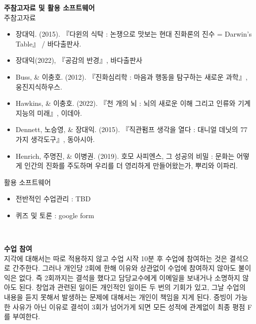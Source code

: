 \documentclass[11pt,letterpaper]{article}
\newcommand{\lefthead}[2]{\noindent\textbf{#1}\hfill\\[#2]}
\begin{document}
\lefthead{주참고자료 및 활용 소프트웨어}{0.3cm}
\noindent 주참고자료 
	\begin{itemize}
	\item  장대익. (2015). 『다윈의 식탁 : 논쟁으로 맛보는 현대 진화론의 진수 = Darwin's Table』 / 바다출판사.
	\item 장대익(2022), 『공감의 반경』, 바다출판사
	\item Buss, \& 이충호. (2012). 『진화심리학 : 마음과 행동을 탐구하는 새로운 과학』, 웅진지식하우스.
	\item Hawkins, \& 이충호. (2022). 『천 개의 뇌 : 뇌의 새로운 이해 그리고 인류와 기계 지능의 미래』, 이데아.
	\item Dennett, 노승영, \& 장대익. (2015). 『직관펌프 생각을 열다 : 대니얼 데닛의 77가지 생각도구』, 동아시아.
	\item Henrich, 주명진, \& 이병권. (2019). 호모 사피엔스, 그 성공의 비밀 : 문화는 어떻게 인간의 진화를 주도하며 우리를 더 영리하게 만들어왔는가, 뿌리와 이파리.
	\end{itemize} \vspace{0.3cm}	

\noindent 활용 소프트웨어 

	\begin{itemize}
		\item 전반적인 수업관리 : TBD
		\item 퀴즈 및 토론 : google form
	\end{itemize}

\noindent  \\[0.3cm]








\newpage

\lefthead{수업 참여}{0.3cm} 
\noindent 지각에 대해서는 따로 적용하지 않고 수업 시작 10분 후 수업에 참여하는 것은 결석으로 간주한다.
그러나 개인당 2회에 한해 이유와 상관없이 수업에 참여하지 않아도 불이익은 없다. 즉 2회까지는 결석을 했다고 담당교수에게 이메일을 보내거나 소명하지 않아도 된다. 창업과 관련된 일이든 개인적인 일이든 두 번의 기회가 있고, 그날 수업의 내용을 듣지 못해서 발생하는 문제에 대해서는 개인이 책임을 지게 된다. 증빙이 가능한 사유가 아닌 이유로 결석이 3회가 넘어가게 되면 모든 성적에 관계없이 최종 평점 F를 부여한다. \\
\end{document}
